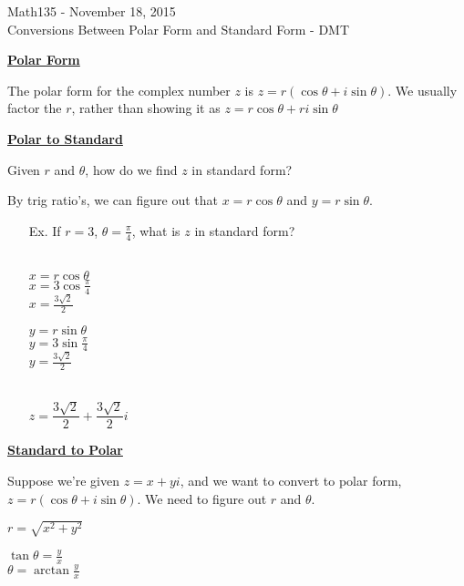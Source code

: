 \documentclass{letter}
\begin{document}
	\begin{center}
		\LARGE Math135 - November 18, 2015\\
		\large Conversions Between Polar Form and Standard Form - DMT
	\end{center}
	\vspace{0.25 in}
	\underline{\textbf{Polar Form}}
	
	The polar form for the complex number $z$ is $z = r (\cos \theta + i \sin \theta)$. We usually factor the $r$, rather than showing it as $z = r \cos \theta + r i \sin \theta$
	
	\underline{\textbf{Polar to Standard}}
	
	Given $r$ and $\theta$, how do we find $z$ in standard form?
	
	By trig ratio's, we can figure out that $x = r \cos \theta$ and $y = r \sin \theta$.
	
	\begin{itemize}
		\item[Ex. ] If $r = 3$, $\theta = \frac{\pi}{4}$, what is $z$ in standard form?\\\\
		\begin{minipage}[t]{0.5\textwidth}
		$x = r \cos \theta$\\
		$x = 3 \cos \frac{\pi}{4}$\\
		$x = \frac{3\sqrt{2}}{2}$\\
		\end{minipage}
		\begin{minipage}[t]{0.5\textwidth}
			$y = r \sin \theta$\\
			$y = 3 \sin \frac{\pi}{4}$\\
			$y = \frac{3 \sqrt{2}}{2}$\\
		\end{minipage}\\
		
		$z = \dfrac{3\sqrt{2}}{2} + \dfrac{3\sqrt{2}}{2} i$
	\end{itemize}
	
	\underline{\textbf{Standard to Polar}}
	
	Suppose we're given $z = x + yi$, and we want to convert to polar form, $z = r(\cos \theta + i \sin \theta)$. We need to figure out $r$ and $\theta$.
	
	$r = \sqrt{x^2 + y^2}$
	
	$\tan\theta = \frac{y}{x}$\\
	$\theta = \arctan \frac{y}{x}$\\
	
\end{document}
